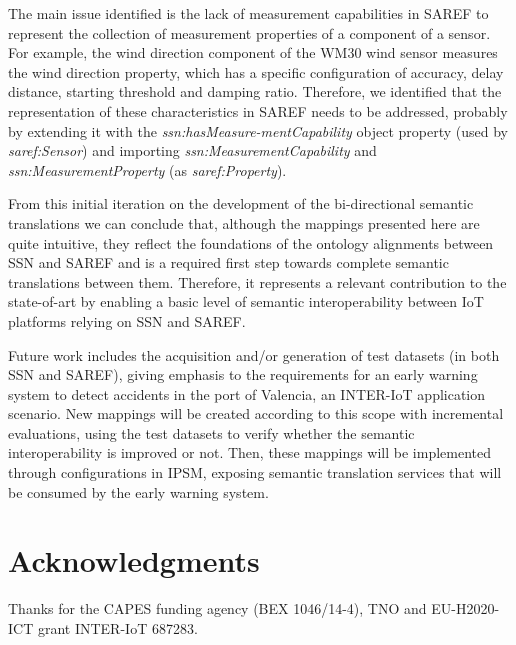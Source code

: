 \documentclass{sig-alternate-05-2015}
\begin{document}
The main issue identified is the lack of measurement capabilities in SAREF to represent the collection of measurement properties of a component of a sensor. For example, the wind direction component of the WM30 wind sensor measures the wind direction property, which has a specific configuration of accuracy, delay distance, starting threshold and damping ratio. Therefore, we identified that the representation of these characteristics in SAREF needs to be addressed, probably by extending it with the \textit{ssn:\-has\-Measure-ment\-Capability} object property (used by \textit{saref:\-Sensor}) and importing \textit{ssn:\-Measurement\-Capability} and \textit{ssn:\-Measurement\-Property} (as \textit{saref:\-Property}).

From this initial iteration on the development of the bi-directional semantic translations we can conclude that, although the mappings presented here are quite intuitive, they reflect the foundations of the ontology alignments between SSN and SAREF and is a required first step towards complete semantic translations between them. Therefore, it represents a relevant contribution to the state-of-art by enabling a basic level of semantic interoperability between IoT platforms relying on SSN and SAREF. 

Future work includes the acquisition and/or generation of test datasets (in both SSN and SAREF), giving emphasis to the requirements for an early warning system \cite{Moreira2017} to detect accidents in the port of Valencia, an INTER-IoT application scenario. New mappings will be created according to this scope with incremental evaluations, using the test datasets to verify whether the semantic interoperability is improved or not. Then, these mappings will be implemented through configurations in IPSM, exposing semantic translation services that will be consumed by the early warning system. 


\section{Acknowledgments}
Thanks for the CAPES funding agency (BEX 1046/14-4), TNO and EU-H2020-ICT grant INTER-IoT 687283.

%

%
%
\end{document}
